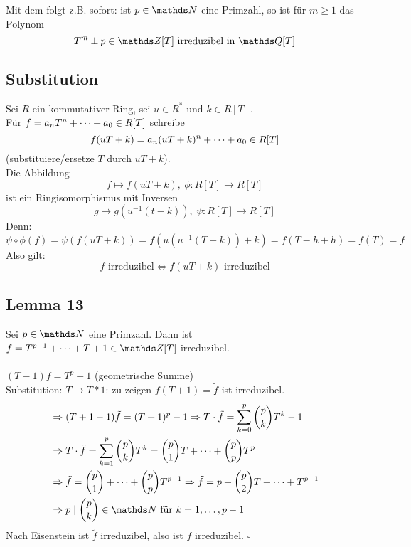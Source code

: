 Mit dem  folgt z.B. sofort: ist $p\in\N$ eine Primzahl, so ist für $m\ge 1$ das Polynom
\[
T^m\pm p\in \Z[T]\text{ irreduzibel in }\Q[T]
\]
\newpage
\subsection{Substitution}
\label{sub:substitution}
Sei $R$ ein kommutativer Ring, sei $u\in R^*$ und $k\in R[T]$.\\
Für $f=a_nT^n+ \dots +a_0\in R[T]$ schreibe
\[
f(uT+k)=a_n(uT+k)^n+ \dots +a_0\in R[T]
\]
(substituiere/ersetze $T$ durch $uT+k$).\\
Die Abbildung
\[
f\mapsto f(uT+k),~\phi:R[T]\to R[T]
\]
ist ein Ringisomorphismus mit Inversen
\[
g\mapsto g(u^{-1}(t-k)),~\psi:R[T]\to R[T]
\]
Denn:
\[
\psi\circ\phi(f)=\psi(f(uT+k))=f(u(u^{-1}(T-k))+k)=f(T-h+h)=f(T)=f
\]
Also gilt:
\[
f\text{ irreduzibel}\Leftrightarrow f(uT+k)\text{ irreduzibel}
\]

\subsection{Lemma 13}
\label{sub:lemma_13}
Sei $p\in \N$ eine Primzahl.
Dann ist $f=T^{p-1}\dt{+}T+1\in \Z[T]$ irreduzibel.\\

\\
$(T-1)f=T^p-1$ (geometrische Summe)\\
Substitution: $T\mapsto T*1$: zu zeigen $f(T+1)=\tilde{f}$ ist irreduzibel.
\begin{equation*}
\begin{aligned}
	&\Rightarrow (T+1-1)\tilde{f}=(T+1)^p-1 \Rightarrow T\cdot \tilde{f}=\sum_{k=0}^{p}\binom{p}{k}T^k-1\\
	&\Rightarrow T\cdot \tilde{f}=\sum_{k=1}^{p}\binom{p}{k}T^k=\binom{p}{1}T\dt{+}\binom{p}{p}T^p\\
	&\Rightarrow \tilde{f}=\binom{p}{1}\dt{+}\binom{p}{p}T^{p-1} \Rightarrow \tilde{f}=p+\binom{p}{2}T\dt{+}T^{p-1}\\
	&\Rightarrow p\mid \binom{p}{k}\in \N\text{ für }k=1\dt{,}p-1
\end{aligned}
\end{equation*}
Nach Eisenstein ist $\tilde{f}$ irreduzibel, also ist $f$ irreduzibel.
\hfill $\square$

